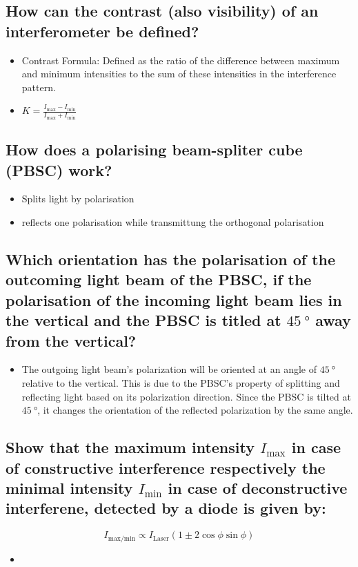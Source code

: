 \subsection*{How can the contrast (also visibility) of an interferometer be defined?}
\begin{itemize}
    \item Contrast Formula: Defined as the ratio of the difference between maximum and minimum intensities to the sum of these intensities in the interference pattern.
    \item $K=\frac{I_\text{max}-I_\text{min}}{I_\text{max}+I_\text{min}}$
\end{itemize}

\subsection*{How does a polarising beam-spliter cube (PBSC) work?}
\begin{itemize}
    \item Splits light by polarisation
    \item reflects one polarisation while transmittung the orthogonal polarisation
\end{itemize}
\subsection*{Which orientation has the polarisation of the outcoming light beam of the PBSC, if the polarisation of the incoming light beam lies in the vertical and the PBSC is titled at $\SI{45}{\degree}$ away from the vertical?}
\begin{itemize}
    \item The outgoing light beam's polarization will be oriented at an angle of $\SI{45}{\degree}$ relative to the vertical. This is due to the PBSC's property of splitting and reflecting light based on its polarization direction. Since the PBSC is tilted at $\SI{45}{\degree}$, it changes the orientation of the reflected polarization by the same angle.
\end{itemize}

\subsection*{Show that the maximum intensity $I_\text{max}$ in case of constructive interference respectively the minimal intensity $I_\text{min}$ in case of deconstructive interferene, detected by a diode is given by:}
\begin{equation*}
    I_\text{max/min}\propto I_\text{Laser}(1\pm2\cos\phi\sin\phi)
\end{equation*}
\begin{itemize}
    \item 
\end{itemize}
